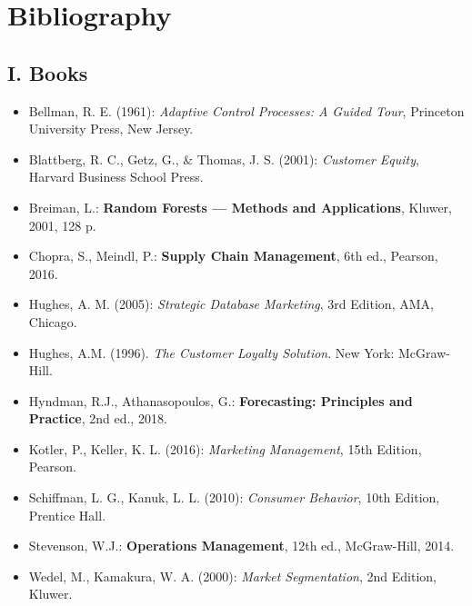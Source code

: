 \documentclass[12pt,a4paper,oneside]{report}
\begin{document}
\section*{Bibliography}

\subsection*{I. Books}
\begin{itemize}
    \item Bellman, R. E. (1961): \textit{Adaptive Control Processes: A Guided Tour}, Princeton University Press, New Jersey.
    \item Blattberg, R. C., Getz, G., \& Thomas, J. S. (2001): \textit{Customer Equity}, Harvard Business School Press.
    \item Breiman, L.: \textbf{Random Forests — Methods and Applications}, Kluwer, 2001, 128 p.
    \item Chopra, S., Meindl, P.: \textbf{Supply Chain Management}, 6th ed., Pearson, 2016.
    \item Hughes, A. M. (2005): \textit{Strategic Database Marketing}, 3rd Edition, AMA, Chicago.
    \item Hughes, A.M. (1996). \textit{The Customer Loyalty Solution}. New York: McGraw-Hill.
    \item Hyndman, R.J., Athanasopoulos, G.: \textbf{Forecasting: Principles and Practice}, 2nd ed., 2018.
    \item Kotler, P., Keller, K. L. (2016): \textit{Marketing Management}, 15th Edition, Pearson.
    \item Schiffman, L. G., Kanuk, L. L. (2010): \textit{Consumer Behavior}, 10th Edition, Prentice Hall.
    \item Stevenson, W.J.: \textbf{Operations Management}, 12th ed., McGraw-Hill, 2014.
    \item Wedel, M., Kamakura, W. A. (2000): \textit{Market Segmentation}, 2nd Edition, Kluwer.
\end{itemize}
\end{document}
